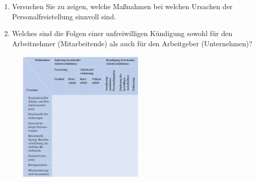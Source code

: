 \begin{enumerate}[label=(\alph*)]
    \item Versuchen Sie zu zeigen, welche Maßnahmen bei welchen Ursachen der Personalfreistellung sinnvoll sind.
    \item Welches sind die Folgen einer unfreiwilligen Kündigung sowohl für den Arbeitnehmer (Mitarbeitende) als auch für den Arbeitgeber (Unternehmen)?
\end{enumerate}

\begin{figure}[H]
    \includegraphics[width=0.55\textwidth]{figures/7_7.png} %
\end{figure}
